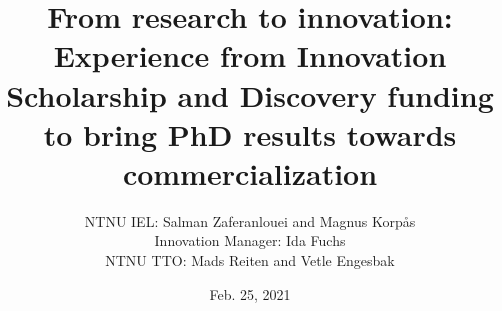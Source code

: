\title[Research\\ $\downarrow$\\ {\tiny $Commercialization$}]{\small From research to innovation: Experience from Innovation Scholarship and Discovery funding to bring PhD results towards commercialization}




\author[]{{\scriptsize NTNU IEL: Salman Zaferanlouei and Magnus Korpås\\ Innovation Manager: Ida Fuchs\\ NTNU TTO: Mads Reiten and Vetle Engesbak}}
\date{\scriptsize Feb. 25, 2021}
